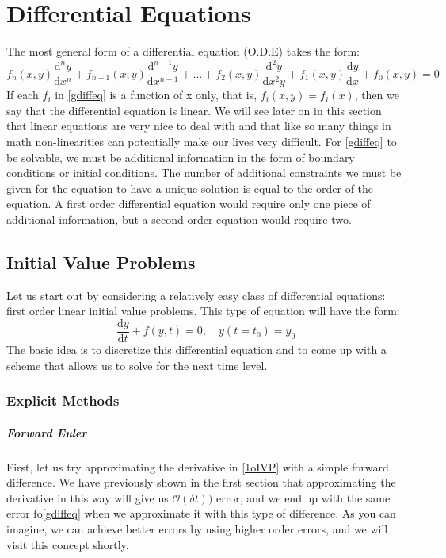 \documentclass[]{article}
\theoremstyle{definition}
\numberwithin{equation}{section}
\begin{document}
	\section{Differential Equations}
	The most general form of a differential equation (O.D.E) takes the form:
	\begin{equation}
	f_n(x,y) \frac{\text{d}^ny}{\text{d}x^n} + f_{n-1}(x,y) \frac{\text{d}^{n-1}y}{\text{d}x^{n-1}} + \ldots + f_2(x,y) \frac{\text{d}^2y}{\text{d}x^2y} + f_1(x,y) \frac{\text{d}y}{\text{d}x} + f_0(x,y) = 0 \label{gdiffeq}
	\end{equation}
	If each $f_i$ in \eqref{gdiffeq} is a function of x only, that is, $f_i(x,y) = f_i(x)$, then we say that the differential equation is linear. We will see later on in this section that linear equations are very nice to deal with and that like so many things in math non-linearities can potentially make our lives very difficult. For \eqref{gdiffeq} to be solvable, we must be additional information in the form of boundary conditions or initial conditions. The number of additional constraints we must be given for the equation to have a unique solution is equal to the order of the equation. A first order differential equation would require only one piece of additional information, but a second order equation would require two.
	\subsection{Initial Value Problems}
	Let us start out by considering a relatively easy class of differential equations: first order linear initial value problems. This type of equation will have the form:
	\begin{equation}
	\frac{\text{d}y}{\text{d}t} + f(y,t) = 0, \quad y(t=t_0) = y_0 \label{1oIVP}
	\end{equation}
	The basic idea is to discretize this differential equation and to come up with a scheme that allows us to solve for the next time level.
	\subsubsection{Explicit Methods}
	\subparagraph{Forward Euler}
	First, let us try approximating the derivative in \eqref{1oIVP} with a simple forward difference. We have previously shown in the first section that approximating the derivative in this way will give us $\mathcal{O}(\delta t))$ error, and we end up with the same error fo\eqref{gdiffeq} when we approximate it with this type of difference. As you can imagine, we can achieve better errors by using higher order errors, and we will visit this concept shortly.
	
\end{document}
